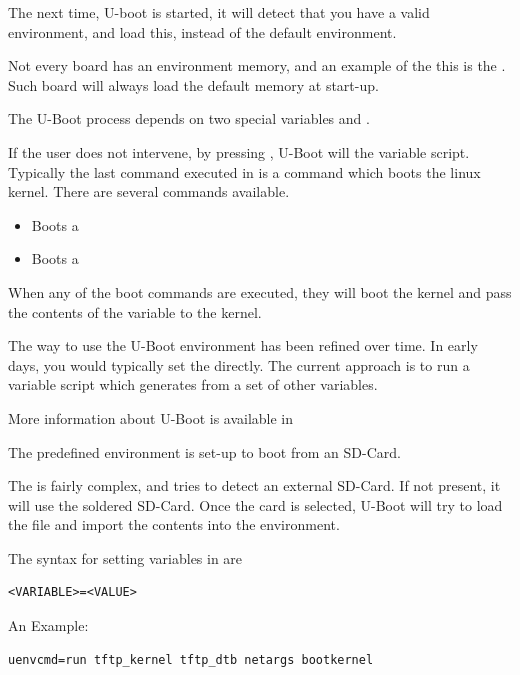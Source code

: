 The next time, U-boot is started, it will detect that you have a valid environment,
and load this, instead of the default environment.

Not every board has an environment memory, and an example of the this is the \devboard.
Such board will always load the default memory at start-up. 

The U-Boot process depends on two special variables  and .

If the user does not intervene, by pressing , U-Boot will 
the  variable script.  Typically the last command executed in 
is a command which boots the linux kernel.  There are several commands available.

\begin{itemize} 

\item {} Boots a 

\item {} Boots a 

\end{itemize}

When any of the boot commands are executed, they will boot the kernel and pass
the contents of the  variable to the kernel.

The way to use the U-Boot environment has been refined over time. In early days,
you would typically set the  directly. The current approach is
to run a variable script which generates  from a set of other variables.

More information about U-Boot is available in 

The \devboard predefined environment is set-up to boot from an SD-Card.

The \devboard {} is fairly complex, and tries to detect an external SD-Card.
If not present, it will use the soldered SD-Card.
Once the card is selected, U-Boot will try to load the file 
and import the contents into the environment.

The syntax for setting variables in  are

\begin{verbatim}
<VARIABLE>=<VALUE>
\end{verbatim}

An Example:

\begin{verbatim}
uenvcmd=run tftp_kernel tftp_dtb netargs bootkernel
\end{verbatim}

